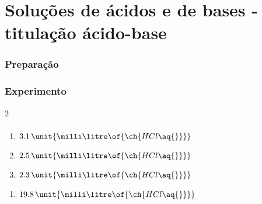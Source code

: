 \part{Soluções de ácidos e de bases - titulação ácido-base}

\section{Preparação}




\section{Experimento}



\begin{sectionBox}2{}



    \subsection*{}
    \begin{enumerate}
        \item \( 3.1\,\unit{\milli\litre\of{\ch{HCl\aq{}}}} \)
        \item \( 2.5\,\unit{\milli\litre\of{\ch{HCl\aq{}}}} \)
        \item \( 2.3\,\unit{\milli\litre\of{\ch{HCl\aq{}}}} \)
    \end{enumerate}

    \begin{enumerate}
        \item \( 19.8\,\unit{\milli\litre\of{\ch{HCl\aq{}}}} \)
    \end{enumerate}

\end{sectionBox}







